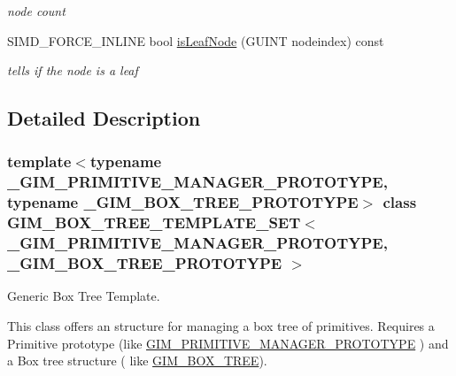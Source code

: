 \begin{Indent}{\bf }
\begin{CompactItemize}
\begin{CompactList}\small\item\em node count \item\end{CompactList}\item 
\hypertarget{class_g_i_m___b_o_x___t_r_e_e___t_e_m_p_l_a_t_e___s_e_t_509b1d5bf9af2486aae90e8d56993092}{
SIMD\_\-FORCE\_\-INLINE bool \hyperlink{class_g_i_m___b_o_x___t_r_e_e___t_e_m_p_l_a_t_e___s_e_t_509b1d5bf9af2486aae90e8d56993092}{isLeafNode} (GUINT nodeindex) const }
\label{class_g_i_m___b_o_x___t_r_e_e___t_e_m_p_l_a_t_e___s_e_t_509b1d5bf9af2486aae90e8d56993092}

\begin{CompactList}\small\item\em tells if the node is a leaf \item\end{CompactList}\end{CompactItemize}
\end{Indent}


\subsection{Detailed Description}
\subsubsection*{template$<$typename \_\-GIM\_\-PRIMITIVE\_\-MANAGER\_\-PROTOTYPE, typename \_\-GIM\_\-BOX\_\-TREE\_\-PROTOTYPE$>$ class GIM\_\-BOX\_\-TREE\_\-TEMPLATE\_\-SET$<$ \_\-GIM\_\-PRIMITIVE\_\-MANAGER\_\-PROTOTYPE, \_\-GIM\_\-BOX\_\-TREE\_\-PROTOTYPE $>$}

Generic Box Tree Template. 

This class offers an structure for managing a box tree of primitives. Requires a Primitive prototype (like \hyperlink{class_g_i_m___p_r_i_m_i_t_i_v_e___m_a_n_a_g_e_r___p_r_o_t_o_t_y_p_e}{GIM\_\-PRIMITIVE\_\-MANAGER\_\-PROTOTYPE} ) and a Box tree structure ( like \hyperlink{class_g_i_m___b_o_x___t_r_e_e}{GIM\_\-BOX\_\-TREE}). 

